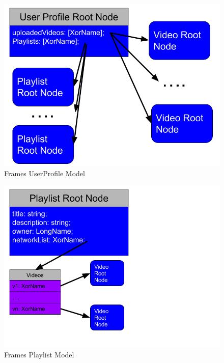 \documentclass[final]{beamer}
\newlength{\onecolwid}
\newlength{\twocolwid}
\begin{document}
\begin{frame}[t]
\begin{columns}[t]
\begin{column}{\twocolwid}
\begin{columns}[t,totalwidth=\twocolwid]
\begin{column}{\onecolwid}
\begin{block}{}
  \begin{figure}
  \includegraphics[width=0.8\linewidth]{user-profile-model.png}
  \caption{Frames UserProfile Model}
  \label{fig:user-profile-model}
  \end{figure}

  \begin{figure}
  \includegraphics[width=0.8\linewidth]{playlist-model.png}
  \caption{Frames Playlist Model}
  \label{fig:playlist-model}
  \end{figure}

\end{block}

\end{column} %

\end{columns} %



\end{column}
\end{columns}
\end{frame}
\end{document}

